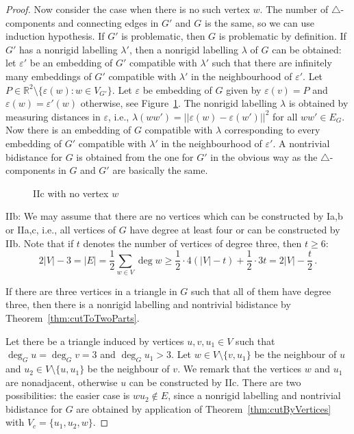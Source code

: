 \documentclass[a4paper, 11pt]{article}
\newcommand{\trcomps}{$\triangle$-components}
\newcommand{\RR}{\mathbb{R}}
\theoremstyle{definition}
\begin{document}
\begin{proof}
Now consider the case when there is no such vertex $w$. The number of \trcomps{} and connecting edges in $G'$ and $G$ is the same, so we can use induction hypothesis. If $G'$ is problematic, then $G$ is problematic by definition. If $G'$ has a nonrigid labelling $\lambda'$, then a nonrigid labelling $\lambda$ of $G$ can be obtained: let $\varepsilon'$ be an embedding of $G'$ compatible with $\lambda'$ such that there are infinitely many embeddings of $G'$ compatible with $\lambda'$ in the neighbourhood of $\varepsilon'$. Let $P\in\RR^2\setminus\{\varepsilon(w)\colon w\in V_{G'}\}$. Let $\varepsilon$ be embedding of $G$ given by $\varepsilon(v)=P$ and $\varepsilon(w)=\varepsilon'(w)$ otherwise, see Figure~\ref{fig:IIc}. The nonrigid labelling $\lambda$ is obtained by measuring distances in $\varepsilon$, i.e., $\lambda(ww')=||\varepsilon(w)-\varepsilon(w')||^2$ for all $ww'\in E_G$. Now there is an embedding of $G$ compatible with $\lambda$ corresponding to every embedding of $G'$ compatible with $\lambda'$ in the neighbourhood of $\varepsilon'$.
A nontrivial bidistance for $G$ is obtained from the one for $G'$ in the obvious way as the \trcomps{} in $G$ and $G'$ are basically the same.
\begin{figure}[htb!]
\centering

\caption{IIc with no vertex $w$}
\label{fig:IIc}
\end{figure}

IIb: We may assume that there are no vertices which can be constructed by Ia,b or IIa,c, i.e., all vertices of $G$ have degree at least four or can be constructed by IIb. Note that if $t$ denotes the number of vertices of degree three, then $t\geq 6$:
$$
2|V|-3=|E|=\frac{1}{2} \sum_{w\in V} \deg w\geq \frac{1}{2}\cdot 4(|V|-t)+\frac{1}{2}\cdot 3 t=2|V|-\frac{t}{2}\,.
$$

If there are three vertices in a triangle in $G$ such that all of them have degree three, then there is a nonrigid labelling and nontrivial bidistance by Theorem~\ref{thm:cutToTwoParts}.

Let there be a triangle induced by vertices $u,v, u_1\in V$ such that $\deg_G u =\deg_G v=3$ and $\deg_G u_1>3$. Let $w\in V\setminus \{v, u_1\}$ be the neighbour of $u$ and $u_2\in V\setminus \{u, u_1\}$ be the neighbour of $v$. We remark that the vertices $w$ and $u_1$ are nonadjacent, otherwise $u$ can be constructed by IIc. There are two possibilities: the easier case is  $wu_2\notin E$, since  a nonrigid labelling and nontrivial bidistance for $G$ are obtained by application of Theorem~\ref{thm:cutByVertices} with $V_c=\{u_1,u_2,w\}$. 


\end{proof}
\end{document}
